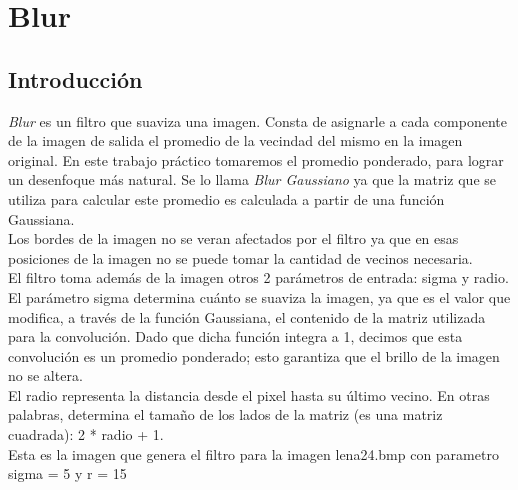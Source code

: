 \documentclass[10pt,a4paper,spanish]{article}
\begin{document}
\section{Blur}

\subsection{Introducción}

\textit{Blur} es un filtro que suaviza una imagen. Consta de asignarle a cada componente de la imagen de salida el promedio de la vecindad del mismo en la imagen original. En este trabajo práctico tomaremos el promedio ponderado, para lograr un desenfoque más natural. Se lo llama \textit{Blur Gaussiano} ya que la matriz que se utiliza para calcular este promedio es calculada a partir de una función Gaussiana. \\

Los bordes de la imagen no se veran afectados por el filtro ya que en esas posiciones de la imagen no se puede tomar la cantidad de vecinos necesaria. \\

El filtro toma además de la imagen otros 2 parámetros de entrada: sigma y radio. \\

El parámetro sigma determina cuánto se suaviza la imagen, ya que es el valor que modifica, a través de la función Gaussiana, el contenido de la matriz utilizada para la convolución. Dado que dicha función integra a 1, decimos que esta convolución es un promedio ponderado; esto garantiza que el brillo de la imagen no se altera.\\

El radio representa la distancia desde el pixel hasta su último vecino. En otras palabras, determina el tamaño de los lados de la matriz (es una matriz cuadrada): 2 * radio + 1. \\

Esta es la imagen que genera el filtro para la imagen lena24.bmp con parametro sigma = 5 y r = 15 \\
\end{document}

